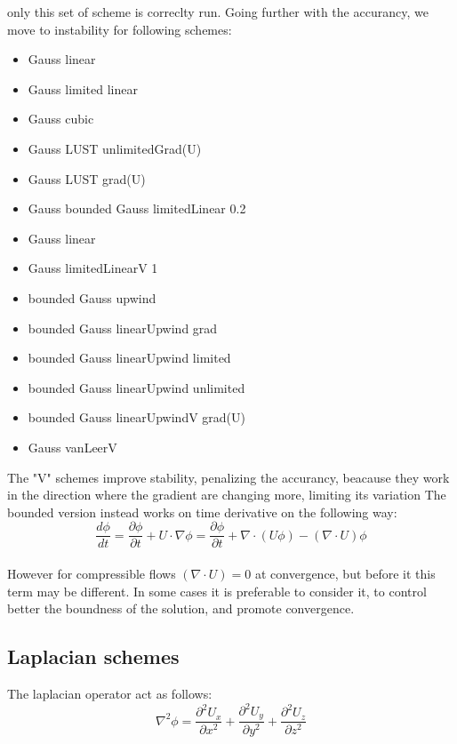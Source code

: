 \documentclass[a4paper,12pt]{article}
\begin{document}
only this set of scheme is correclty run. Going further with the accurancy, we move to instability for following schemes:


\begin{itemize} 

 \item {\ttfamily Gauss linear}
 \item {\ttfamily Gauss limited linear}
 \item {\ttfamily Gauss cubic}
 \item {\ttfamily Gauss LUST unlimitedGrad(U)}
 \item {\ttfamily Gauss LUST grad(U)}
 \item {\ttfamily Gauss bounded Gauss limitedLinear 0.2}
 \item {\ttfamily Gauss linear}
 \item {\ttfamily Gauss limitedLinearV 1}
 \item {\ttfamily bounded Gauss upwind}
 \item {\ttfamily bounded Gauss linearUpwind grad}
 \item {\ttfamily bounded Gauss linearUpwind limited}
 \item {\ttfamily bounded Gauss linearUpwind unlimited}
 \item {\ttfamily bounded Gauss linearUpwindV grad(U)}
 \item {\ttfamily Gauss vanLeerV}
\end{itemize} 

The "V" schemes improve stability, penalizing the accurancy, beacause they work in the direction where the gradient are changing more, limiting its variation
The bounded version instead works on time derivative on the following way:
\begin{equation}
\frac{d \phi}{dt} = \frac{\partial \phi}{\partial t} + U \cdot \nabla \phi = \frac{\partial \phi}{\partial t} + \nabla \cdot (U \phi) - ( \nabla \cdot U ) \phi
\end{equation}
\\ However for compressible flows $( \nabla \cdot U ) = 0 $ at convergence, but before it this term may be different. In some cases it is preferable to consider it, to control better the boundness of the solution, and promote convergence.

\subsection{Laplacian schemes}
The laplacian operator act as follows:
\begin{equation}
\nabla^2 \phi = \frac{\partial^2 U_x}{\partial x^2}+ \frac{\partial^2 U_y}{\partial y^2} + \frac{\partial^2 U_z}{\partial z^2}
\end{equation}
\end{document}
